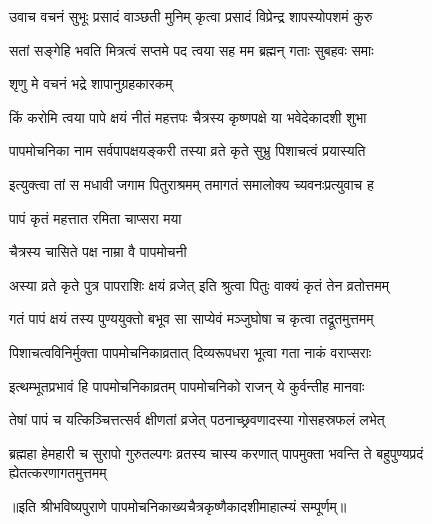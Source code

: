 \twolineshloka
{उवाच वचनं सुभूः प्रसादं वाञ्छती मुनिम्}
{कृत्वा प्रसादं विप्रेन्द्र शापस्योपशमं कुरु} %

\twolineshloka
{सतां सङ्गेहि भवति मित्रत्वं सप्तमे पद}
{त्वया सह मम ब्रह्मन् गताः सुबहवः समाः} %



\onelineshloka
{शृणु मे वचनं भद्रे शापानुग्रहकारकम्} %

\twolineshloka
{किं करोमि त्वया पापे क्षयं नीतं महत्तपः}
{चैत्रस्य कृष्णपक्षे या भवेदेकादशी शुभा} %

\twolineshloka
{पापमोचनिका नाम सर्वपापक्षयङ्करी}
{तस्या व्रते कृते सुभ्रु पिशाचत्वं प्रयास्यति} %

\twolineshloka
{इत्युक्त्वा तां स मधावी जगाम पितुराश्रमम्}
{तमागतं समालोक्य च्यवनःप्रत्युवाच ह} %



\onelineshloka
{पापं कृतं महत्तात रमिता चाप्सरा मया} %



\onelineshloka
{चैत्रस्य चासिते पक्ष नाम्रा वै पापमोचनी} %

\twolineshloka
{अस्या व्रते कृते पुत्र पापराशिः क्षयं व्रजेत्}
{इति श्रुत्वा पितुः वाक्यं कृतं तेन व्रतोत्तमम्} %

\twolineshloka
{गतं पापं क्षयं तस्य पुण्ययुक्तो बभूव सा}
{साप्येवं मञ्जुघोषा च कृत्वा तद्रूतमुत्तमम्} %

\twolineshloka
{पिशाचत्वविनिर्मुक्ता पापमोचनिकाव्रतात्}
{दिव्यरूपधरा भूत्वा गता नाकं वराप्सराः} %


\twolineshloka
{इत्थम्भूतप्रभावं हि पापमोचनिकाव्रतम्}
{पापमोचनिको राजन् ये कुर्वन्तीह मानवाः} %

\twolineshloka
{तेषां पापं च यत्किञ्चित्तत्सर्व क्षीणतां व्रजेत्}
{पठनाच्छ्रवणादस्या गोसहस्रफलं लभेत्} %


\threelineshloka
{ब्रह्महा हेमहारी च सुरापो गुरुतल्पगः}
{व्रतस्य चास्य करणात् पापमुक्ता भवन्ति ते}
{बहुपुण्यप्रदं ह्येतत्करणागतमुत्तमम्} %

॥इति श्रीभविष्यपुराणे पापमोचनिकाख्यचैत्रकृष्णैकादशीमाहात्म्यं सम्पूर्णम्॥


